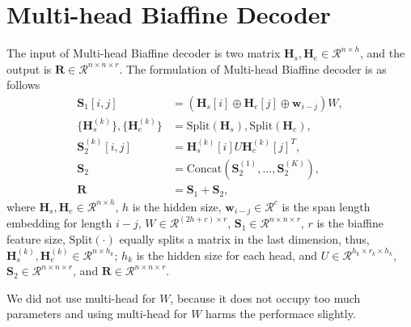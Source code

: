 \documentclass[11pt]{article}
\begin{document}
\section{Multi-head Biaffine Decoder}
The input of Multi-head Biaffine decoder is two matrix $\mathbf{H}_s,\mathbf{H}_e \in \mathcal{R}^{n \times h}$, and the output is $\mathbf{R} \in \mathcal{R}^{n \times n \times r}$. The formulation of Multi-head Biaffine decoder is as follows
\begin{align}
  \mathbf{S}_1[i, j] & = (\mathbf{H}_s[i]\oplus \mathbf{H}_e[j] \oplus \mathbf{w}_{i-j})W, \nonumber\\
  \{\mathbf{H}_s^{(k)}\}, \{\mathbf{H}_e^{(k)}\} & = \mathrm{Split}(\mathbf{H}_s), \mathrm{Split}(\mathbf{H}_e), \nonumber \\
  \mathbf{S}_2^{(k)}[i,j] & = \mathbf{H}_s^{(k)}[i]U\mathbf{H}_e^{(k)}[j]^T, \nonumber \\
  \mathbf{S}_2 & = \mathrm{Concat}(\mathbf{S}^{(1)}_2, ..., \mathbf{S}^{(K)}_2), \nonumber \\
  \mathbf{R} & = \mathbf{S}_1 + \mathbf{S}_2, \nonumber
\end{align}
where $\mathbf{H}_s, \mathbf{H}_e \in \mathcal{R}^{n \times h}$, $h$ is the hidden size, $\mathbf{w}_{i-j} \in \mathcal{R}^{c}$ is the span length embedding for length $i-j$, $W \in \mathcal{R}^{(2h+c) \times r}$, $\mathbf{S}_1 \in \mathcal{R}^{n \times n \times r}$, $r$ is the biaffine feature size, $\mathrm{Split}(\cdot)$ equally splits a matrix in the last dimension, thus, $\mathbf{H}_s^{(k)},\mathbf{H}_e^{(k)} \in \mathcal{R}^{n \times h_k}$; $h_k$ is the hidden size for each head, and $U \in \mathcal{R}^{h_k \times r_k \times h_k}$, $\mathbf{S}_2 \in \mathcal{R}^{n \times n \times r }$, and $\mathbf{R} \in \mathcal{R}^{n \times n \times r }$.

We did not use multi-head for $W$, because it does not occupy too much parameters and using multi-head for $W$ harms the performace slightly.
\end{document}
